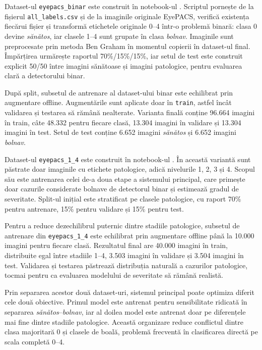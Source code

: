 \documentclass[12pt, a4paper, twoside, romanian]{teza-upb}
\begin{document}
Dataset-ul \texttt{eyepacs\_binar} este construit în notebook-ul
. Scriptul pornește de la fișierul
\texttt{all\_labels.csv} și de la imaginile originale EyePACS, verifică existența fiecărui fișier și
transformă etichetele originale 0--4 într-o problemă binară: clasa 0 devine \textit{sănătos}, iar
clasele 1--4 sunt grupate în clasa \textit{bolnav}. Imaginile sunt preprocesate prin metoda Ben Graham
în momentul copierii în dataset-ul final. Împărțirea urmărește raportul 70\%/15\%/15\%, iar setul de
test este construit explicit 50/50 între imagini sănătoase și imagini patologice, pentru evaluarea
clară a detectorului binar.
\bigskip

După split, subsetul de antrenare al dataset-ului binar este echilibrat prin augmentare offline.
Augmentările sunt aplicate doar în \texttt{train}, astfel încât validarea și testarea să rămână
nealterate. Varianta finală conține 96.664 imagini în train, câte 48.332 pentru fiecare clasă,
13.304 imagini în validare și 13.304 imagini în test. Setul de test conține 6.652 imagini
\textit{sănătos} și 6.652 imagini \textit{bolnav}.
\bigskip

Dataset-ul \texttt{eyepacs\_1\_4} este construit în notebook-ul
. În această variantă sunt păstrate doar imaginile cu
etichete patologice, adică nivelurile 1, 2, 3 și 4. Scopul său este antrenarea celei de-a doua etape
a sistemului principal, care primește doar cazurile considerate bolnave de detectorul binar și estimează
gradul de severitate. Split-ul inițial este stratificat pe clasele patologice, cu raport 70\% pentru
antrenare, 15\% pentru validare și 15\% pentru test.
\bigskip

Pentru a reduce dezechilibrul puternic dintre stadiile patologice, subsetul de antrenare din
\texttt{eyepacs\_1\_4} este echilibrat prin augmentare offline până la 10.000 imagini pentru fiecare
clasă. Rezultatul final are 40.000 imagini în train, distribuite egal între stadiile 1--4, 3.503
imagini în validare și 3.504 imagini în test. Validarea și testarea păstrează distribuția naturală a
cazurilor patologice, tocmai pentru ca evaluarea modelului de severitate să rămână realistă.
\bigskip

Prin separarea acestor două dataset-uri, sistemul principal poate optimiza diferit cele două obiective.
Primul model este antrenat pentru sensibilitate ridicată în separarea \textit{sănătos}--\textit{bolnav},
iar al doilea model este antrenat doar pe diferențele mai fine dintre stadiile patologice. Această
organizare reduce conflictul dintre clasa majoritară 0 și clasele de boală, problemă frecventă în
clasificarea directă pe scala completă 0--4.
\end{document}
